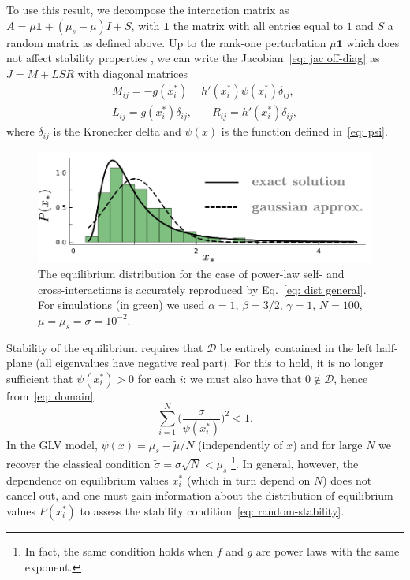 \documentclass[
 prl,
 twocolumn,
 amsmath,
 amssymb,
 aps,
]{revtex4-2}
\begin{document}
To use this result, we decompose the interaction matrix as $A = \mu\mathbf{1} + (\mu_s-\mu)I + S$,
with $\mathbf{1}$ the matrix with all entries equal to $1$ and $S$ a random matrix as defined above.
Up to the rank-one perturbation $\mu\mathbf{1}$ which does not affect stability properties \cite{Stone2018}, we can write the Jacobian~\eqref{eq: jac off-diag} as $J = M + LSR$ with diagonal matrices
\begin{align}
    M_{ij} = - g(x_i^*)&h'(x_i^*)\psi(x_i^*)\delta_{ij}, \nonumber \\ 
    L_{ij} = g(x_i^*)\delta_{ij}, & \quad R_{ij} = h'(x_i^*)\delta_{ij}, 
\end{align}
where $\delta_{ij}$ is the Kronecker delta and $\psi(x)$ is the function defined in~\eqref{eq: psi}.
\begin{figure}[t!]
    \includegraphics[width=.45\textwidth]{cavity.pdf}
    \caption{The equilibrium distribution for the case of power-law self- and cross-interactions is accurately reproduced by Eq.~\eqref{eq: dist general}.
    For simulations (in green) we used $\alpha=1$, $\beta=3/2$,
    $\gamma=1$, $N=100$, $\mu=\mu_s=\sigma=10^{-2}$.}
    \label{fig: cavity sol.}
\end{figure}
Stability of the equilibrium requires that $\mathcal{D}$ be entirely contained in the left half-plane (all eigenvalues have negative real part). For this to hold, it is no longer sufficient that $\psi(x_i^*) > 0$ for each $i$: we must also have that $0\notin \mathcal{D}$, hence from~\eqref{eq: domain}:
\begin{equation}
    \sum_{i=1}^N \Big(\frac{\sigma}{\psi(x_i^*)}\Big)^{2}
    < 1.
    \label{eq: random-stability}
\end{equation}
In the GLV model, $\psi(x) = \mu_s - \tilde{\mu}/N$ (independently of $x$) and for large $N$ we recover the classical condition $\tilde{\sigma} = \sigma\sqrt{N} < \mu_s$ \footnote{In fact, the same condition holds when $f$ and $g$ are power laws with the same exponent.}. In general, however, the dependence on equilibrium values $x_i^*$ (which in turn depend on $N$) does not cancel out, and one must gain information about the distribution of equilibrium values $P(x_i^*)$ to assess the stability condition~\eqref{eq: random-stability}.
\end{document}
